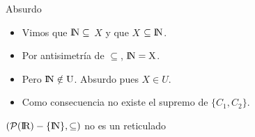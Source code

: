 \documentclass[10pt]{beamer}
\newcommand{\powerset}{\mathcal{P}}
\newcommand{\R}{\rm I\!R}
\newcommand{\N}{\rm I\!N}
\newcommand{\universe}{\powerset(\R) - \{\N\}}
\begin{document}
\begin{frame}{Absurdo}
  \begin{itemize}[<+->]

    \item Vimos que $\N \subseteq$ $X$ y que $X$ $\subseteq \N$.
    \item Por antisimetría de $\subseteq$, \alert{$\N = X$}.
    \item Pero {$\N \notin U$}. \alert{Absurdo} pues $X \in U$.
    \item Como consecuencia no existe el supremo de $\{C_1, C_2\}$.
  \end{itemize}
\end{frame}

\begin{frame}[standout]
  \begin{center}
  $(\universe, \subseteq)$ no es un reticulado
  \end{center}
\end{frame}
\end{document}

